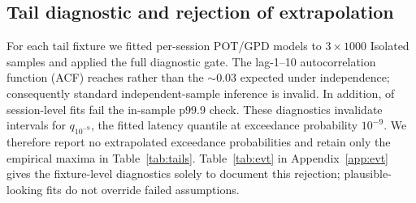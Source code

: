 \subsection{Tail diagnostic and rejection of extrapolation}
\label{sec:eval-evt}
For each tail fixture we fitted per-session POT/GPD models to $3{\times}1000$ Isolated
samples and applied the full diagnostic gate. The lag-1--10 autocorrelation function (ACF) reaches
\evtAcfWorst{} rather than the ${\sim}0.03$ expected under independence; consequently
standard independent-sample inference is invalid. In addition,
\evtFitFailures{} of \evtFitChecks{} session-level fits fail the in-sample p99.9 check. These
diagnostics invalidate intervals for $q_{10^{-9}}$, the fitted latency quantile at exceedance
probability $10^{-9}$. We
therefore report no extrapolated exceedance probabilities and retain only the empirical
maxima in Table~\ref{tab:tails}. Table~\ref{tab:evt} in Appendix~\ref{app:evt} gives the
fixture-level diagnostics solely to document this rejection; plausible-looking fits do not
override failed assumptions.

